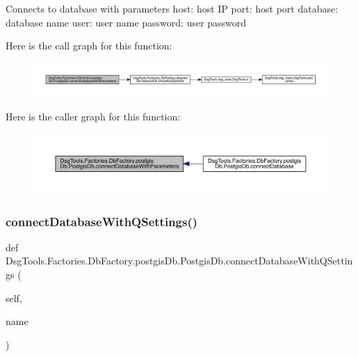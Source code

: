 \begin{DoxyVerb}Connects to database with parameters
host: host IP
port: host port
database: database name
user: user name
password: user password
\end{DoxyVerb}
 Here is the call graph for this function\+:
\nopagebreak
\begin{figure}[H]
\begin{center}
\leavevmode
\includegraphics[width=350pt]{class_dsg_tools_1_1_factories_1_1_db_factory_1_1postgis_db_1_1_postgis_db_a552929486e4a1e3d3fc9b87dffc8e0b9_cgraph}
\end{center}
\end{figure}
Here is the caller graph for this function\+:
\nopagebreak
\begin{figure}[H]
\begin{center}
\leavevmode
\includegraphics[width=350pt]{class_dsg_tools_1_1_factories_1_1_db_factory_1_1postgis_db_1_1_postgis_db_a552929486e4a1e3d3fc9b87dffc8e0b9_icgraph}
\end{center}
\end{figure}
\mbox{\label{class_dsg_tools_1_1_factories_1_1_db_factory_1_1postgis_db_1_1_postgis_db_a122957ae0b6aae812ae0b7be9372cb52}} 
\subsubsection{\texorpdfstring{connect\+Database\+With\+Q\+Settings()}{connectDatabaseWithQSettings()}}
{\footnotesize\ttfamily def Dsg\+Tools.\+Factories.\+Db\+Factory.\+postgis\+Db.\+Postgis\+Db.\+connect\+Database\+With\+Q\+Settings (\begin{DoxyParamCaption}\item[{}]{self,  }\item[{}]{name }\end{DoxyParamCaption})}

